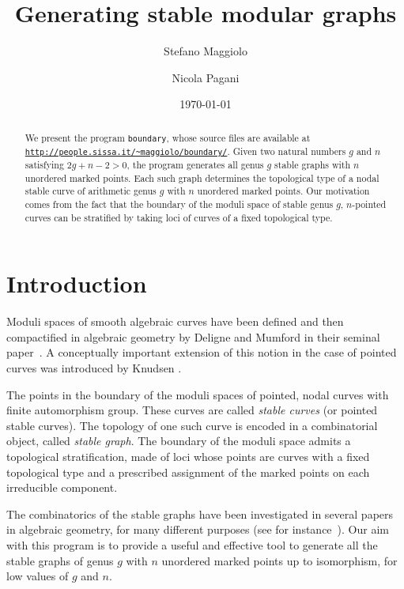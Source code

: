 \documentclass{amsart}
\title{Generating stable modular graphs}
\author{Stefano Maggiolo}
\author{Nicola Pagani}
\date{\today}
\theoremstyle{plain}
\theoremstyle{definition}
\begin{document}
\begin{abstract}
  We present the program \texttt{boundary}, whose source files are
  available at \href{http://people.sissa.it/~maggiolo/boundary/}
  {\texttt{http://people.sissa.it/\~{}maggiolo/boundary/}}. Given two
  natural numbers $g$ and $n$ satisfying $2g+n-2>0$, the program
  generates all genus $g$ stable graphs with $n$ unordered marked points. Each
  such graph determines the topological type of a nodal stable curve
  of arithmetic genus $g$ with $n$ unordered marked points. Our motivation comes
  from the fact that the boundary of the moduli space of stable genus
  $g$, $n$-pointed curves can be stratified by taking loci of curves
  of a fixed topological type.
\end{abstract}

\maketitle
\setcounter{tocdepth}{1}
\tableofcontents



\section{Introduction}

Moduli spaces of smooth algebraic curves have been defined and then
compactified in algebraic geometry by Deligne and Mumford in their
seminal paper~\cite{delignemumford}. A conceptually important
extension of this notion in the case of pointed curves was introduced
by Knudsen \cite{knudsen}.

The points in the boundary of the moduli spaces of pointed, nodal
curves with finite automorphism group. These curves are called
\emph{stable curves} (or pointed stable curves). The topology of one
such curve is encoded in a combinatorial object, called \emph{stable
  graph}.  The boundary of the moduli space admits a topological
stratification, made of loci whose points are curves with a fixed
topological type and a prescribed assignment of the marked points on
each irreducible component.

The combinatorics of the stable graphs have been investigated in
several papers in algebraic geometry, for many different purposes (see
for instance~\cite{modularoperads,opstall,opstall2,stephanie2}). Our
aim with this program is to provide a useful and effective tool to
generate all the stable graphs of genus $g$ with $n$ unordered marked
points up to isomorphism, for low values of $g$ and $n$.
\end{document}
